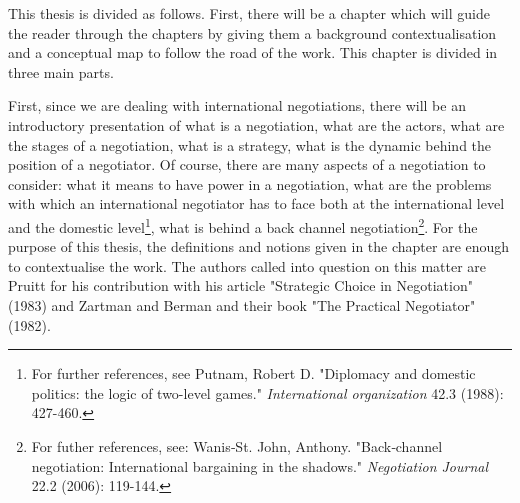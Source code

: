 \documentclass[../main.tex]{subfiles}
\begin{document}
This thesis is divided as follows. First, there will be a chapter which will guide the reader through the chapters by giving them a background contextualisation and a  conceptual map to follow the road of the work. 
This chapter is divided in three main parts.

First, since we are dealing with international negotiations, there will be an introductory presentation of what is a negotiation, what are the actors, what are the stages of a negotiation, what is a strategy, what is the dynamic behind the position of a negotiator. Of course, there are many aspects of a negotiation to consider: what it means to have power in a negotiation, what are the problems with which an international negotiator has to face both at the international level and the domestic level\footnote{For further references, see Putnam, Robert D. "Diplomacy and domestic politics: the logic of two-level games." \textit{International organization} 42.3 (1988): 427-460.}, what is behind a back channel negotiation\footnote{For futher references, see: Wanis‐St. John, Anthony. "Back‐channel negotiation: International bargaining in the shadows." \textit{Negotiation Journal} 22.2 (2006): 119-144.}.
For the purpose of this thesis, the definitions and notions given in the chapter are enough to contextualise the work.
The authors called into question on this matter are Pruitt for his contribution with his article "Strategic Choice in Negotiation" (1983) and Zartman and Berman and their book "The Practical Negotiator" (1982).
\end{document}
